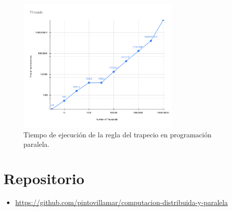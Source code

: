 \documentclass[a4paper]{article}
\begin{document}
\begin{figure}[H]
\centering
\includegraphics[width=0.7\textwidth]{Threads.pdf}
\caption{Tiempo de ejecución de la regla del trapecio en programación paralela.}
\end{figure}

\pagebreak

\section{Repositorio}
\begin{itemize}
\item \href{https://github.com/pintovillamar/computacion-distribuida-y-paralela}{https://github.com/pintovillamar/computacion-distribuida-y-paralela}
\end{itemize}




\end{document}
